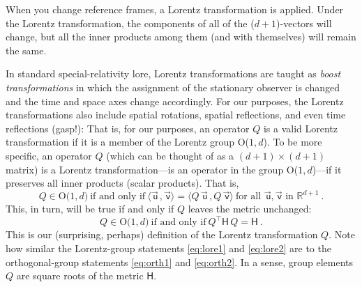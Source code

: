 \documentclass{article}
\newcommand{\metric}{\mathsf{H}}
\newcommand\upvec[1]{\!\vec{\,\mathrm{#1}}}
\newcommand{\Lvec}[1]{\upvec{\mathsf{#1}}} %
\newcommand{\inner}[2]{\langle{#1}\,,{#2}\rangle}
\newcommand{\plus}{\!+\!} %
\begin{document}
When you change reference frames, a Lorentz transformation is applied.
Under the Lorentz transformation, the components of all of the ($d\plus1$)-vectors will change, but all the inner products among them (and with themselves) will remain the same.

In standard special-relativity lore, Lorentz transformations are taught as \emph{boost transformations} in which the assignment of the stationary observer is changed and the time and space axes change accordingly.
For our purposes, the Lorentz transformations also include spatial rotations, spatial reflections, and even time reflections (gasp!):
That is, for our purposes, an operator $Q$ is a valid Lorentz transformation if it is a member of the Lorentz group O($1,d$).
To be more specific, an operator $Q$ (which can be thought of as a $(d+1)\times(d+1)$ matrix) is a Lorentz transformation---is an operator in the group O($1,d$)---if it preserves all inner products (scalar products). 
That is,
\begin{equation}
    Q \in \mbox{O($1,d$)} ~ \mbox{if and only if} ~ \inner{\Lvec{u}}{\Lvec{v}}=\inner{Q\,\Lvec{u}}{Q\,\Lvec{v}} ~ \mbox{for all $\Lvec{u},\Lvec{v}$ in $\mathbb{R}^{d+1}$} ~.\label{eq:lore1}
\end{equation}
This, in turn, will be true if and only if $Q$ leaves the metric unchanged:
\begin{equation}
    Q \in \mbox{O($1,d$)} ~ \mbox{if and only if} ~ Q^\top\metric\,Q=\metric ~.\label{eq:lore2}
\end{equation}
This is our (surprising, perhaps) definition of the Lorentz transformation $Q$.
Note how similar the Lorentz-group statements \eqref{eq:lore1} and \eqref{eq:lore2} are to the orthogonal-group statements \eqref{eq:orth1} and \eqref{eq:orth2}.
In a sense, group elements $Q$ are square roots of the metric $\metric$.
\end{document}
